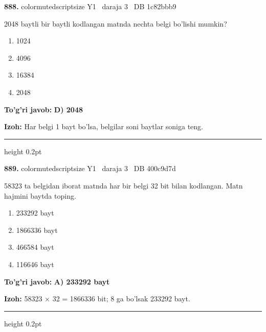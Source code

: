 \documentclass[10pt,a4paper,oneside]{article}
\begin{document}
\noindent\textbf{\color{ink}888.}  {color{muted}scriptsize Y1 \textbullet\ daraja 3 \textbullet\ DB 1c82bbb9}
\par
2048 baytli bir baytli kodlangan matnda nechta belgi bo'lishi mumkin?
\begin{enumerate}[label=\Alph*),leftmargin=9mm]
\item 1024
\item 4096
\item 16384
\item 2048
\end{enumerate}
\begin{tcolorbox}[enhanced,breakable,colback=teal!4,colframe=teal!50!black,boxrule=0.5pt,arc=1.1mm,left=3mm,right=3mm,top=1.7mm,bottom=1.7mm,before skip=2mm,after skip=2mm]
\textbf{\color{teal}To'g'ri javob:} \textbf{D) 2048}
\par\smallskip
\textbf{Izoh:} Har belgi 1 bayt bo'lsa, belgilar soni baytlar soniga teng.
\end{tcolorbox}
\vspace{2mm}\hrule height 0.2pt \vspace{3mm}

\noindent\textbf{\color{ink}889.}  {color{muted}scriptsize Y1 \textbullet\ daraja 3 \textbullet\ DB 400c9d7d}
\par
58323 ta belgidan iborat matnda har bir belgi 32 bit bilan kodlangan. Matn hajmini baytda toping.
\begin{enumerate}[label=\Alph*),leftmargin=9mm]
\item 233292 bayt
\item 1866336 bayt
\item 466584 bayt
\item 116646 bayt
\end{enumerate}
\begin{tcolorbox}[enhanced,breakable,colback=teal!4,colframe=teal!50!black,boxrule=0.5pt,arc=1.1mm,left=3mm,right=3mm,top=1.7mm,bottom=1.7mm,before skip=2mm,after skip=2mm]
\textbf{\color{teal}To'g'ri javob:} \textbf{A) 233292 bayt}
\par\smallskip
\textbf{Izoh:} 58323 \ensuremath{\times} 32 = 1866336 bit; 8 ga bo'lsak 233292 bayt.
\end{tcolorbox}
\vspace{2mm}\hrule height 0.2pt \vspace{3mm}
\end{document}
